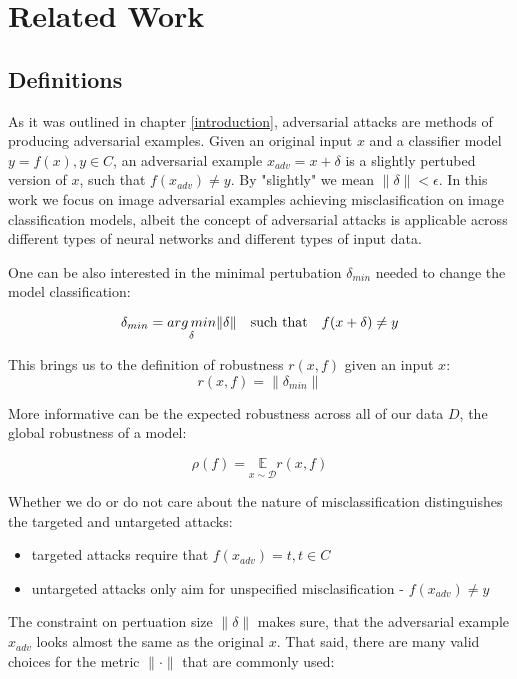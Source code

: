 \section{Related Work}
\label{related_work}

\subsection{Definitions}
As it was outlined in chapter \ref{introduction}, adversarial attacks are methods of producing adversarial examples. Given an original input $x$ and a classifier model $y = f(x), y \in C$, an adversarial example $x_{adv} = x + \delta$ is a slightly pertubed version of $x$, such that $f(x_{adv}) \neq y$. By "slightly" we mean $\lVert \delta \rVert < \epsilon$. In this work we focus on image adversarial examples achieving misclasification on image classification models, albeit the concept of adversarial attacks is applicable across different types of neural networks and different types of input data.

One can be also interested in the minimal pertubation $\delta_{min}$ needed to change the model classification:

$$\delta_{min} = \underset{\delta}{arg\,min} \lVert \delta \rVert \quad \text{such that} \quad f(x + \delta) \neq y$$

This brings us to the definition of robustness $r(x, f)$ given an input $x$:
$$r(x, f) = \lVert \delta_{min} \rVert$$

More informative can be the expected robustness across all of our data $D$, the global robustness of a model:

$$\rho (f) = \underset{x \sim \mathcal D}{\mathbb E} r(x, f)$$

Whether we do or do not care about the nature of misclassification distinguishes the targeted and untargeted attacks:

\begin{itemize}
    \item targeted attacks require that $f(x_{adv}) = t, t \in C$
    \item untargeted attacks only aim for unspecified misclasification - $f(x_{adv}) \neq y$
\end{itemize}


The constraint on pertuation size $\lVert \delta \rVert$ makes sure, that the adversarial example $x_{adv}$ looks almost the same as the original $x$. That said, there are many valid choices for the metric $\lVert \cdot \rVert$ that are commonly used:

